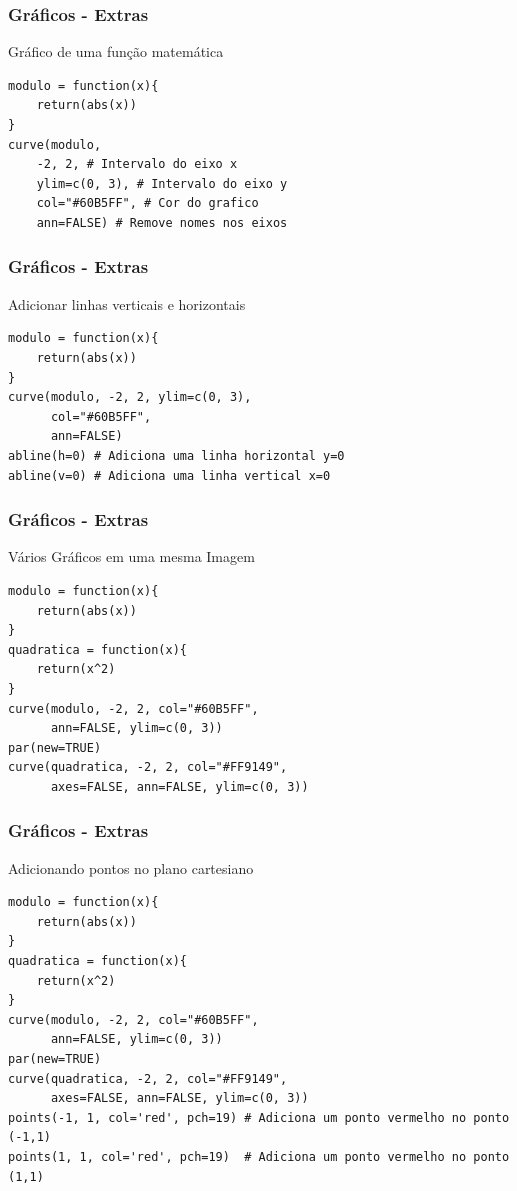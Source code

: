 \begin{frame}[fragile]
\frametitle{Gráficos - Extras}
\begin{block}{Gráfico de uma função matemática}
\begin{verbatim}
modulo = function(x){
    return(abs(x))
}
curve(modulo,
    -2, 2, # Intervalo do eixo x
    ylim=c(0, 3), # Intervalo do eixo y
    col="#60B5FF", # Cor do grafico
    ann=FALSE) # Remove nomes nos eixos
\end{verbatim}
\end{block}
\end{frame}

\begin{frame}[fragile]
\frametitle{Gráficos - Extras}
\begin{block}{Adicionar linhas verticais e horizontais}
\begin{verbatim}
modulo = function(x){
    return(abs(x))
}
curve(modulo, -2, 2, ylim=c(0, 3),
      col="#60B5FF",
      ann=FALSE) 
abline(h=0) # Adiciona uma linha horizontal y=0
abline(v=0) # Adiciona uma linha vertical x=0
\end{verbatim}
\end{block}
\end{frame}


\begin{frame}[fragile]
    \frametitle{Gráficos - Extras}
    \begin{block}{Vários Gráficos em uma mesma Imagem}
    \begin{verbatim}
modulo = function(x){
    return(abs(x))
}
quadratica = function(x){
    return(x^2)
}
curve(modulo, -2, 2, col="#60B5FF",
      ann=FALSE, ylim=c(0, 3))
par(new=TRUE)
curve(quadratica, -2, 2, col="#FF9149",
      axes=FALSE, ann=FALSE, ylim=c(0, 3))
\end{verbatim}
\end{block}
\end{frame}

\begin{frame}[fragile]
\frametitle{Gráficos - Extras}
\begin{block}{Adicionando pontos no plano cartesiano}
\begin{verbatim}
modulo = function(x){
    return(abs(x))
}
quadratica = function(x){
    return(x^2)
}
curve(modulo, -2, 2, col="#60B5FF",
      ann=FALSE, ylim=c(0, 3))
par(new=TRUE)
curve(quadratica, -2, 2, col="#FF9149",
      axes=FALSE, ann=FALSE, ylim=c(0, 3))
points(-1, 1, col='red', pch=19) # Adiciona um ponto vermelho no ponto (-1,1)
points(1, 1, col='red', pch=19)  # Adiciona um ponto vermelho no ponto (1,1)      
\end{verbatim}
\end{block}
\end{frame}

